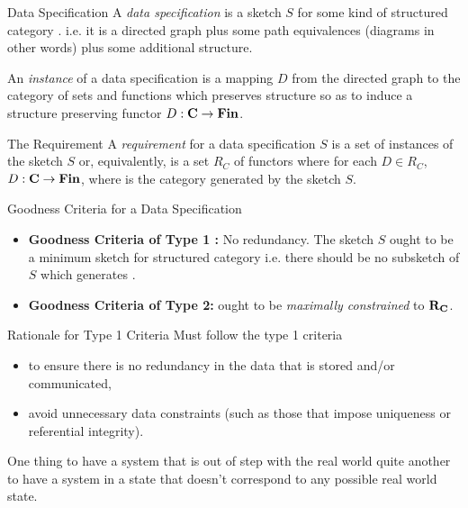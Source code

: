 
\begin{frame}{Data Specification}
A \textit{data specification} is a sketch $S$ for some kind of structured category \catc.
i.e. it is a directed graph plus some path equivalences (diagrams in other words) plus 
some additional structure.  

An \textit{instance} of a data specification is a mapping $D$ from the directed graph
to the category of sets and functions which preserves structure so as
to induce a structure preserving functor $D: \textbf{C} \rightarrow \textbf{Fin}$.
\end{frame}

\begin{frame}{The Requirement}
A \textit{requirement} for a data specification $S$ 
is a set of instances of the sketch $S$ or, equivalently, is a set $R_C$ of functors where for each
$D \in R_C$, $D: \textbf{C} \rightarrow \textbf{Fin}$, where \catcw is the category generated by the sketch $S$.
\end{frame}

\begin{frame}{Goodness Criteria for a Data Specification}
\IfSforCwithRCwordsvariant 
\begin{itemize}
\item 
\textbf {Goodness Criteria of Type 1 :} No redundancy. The sketch $S$ ought to be a minimum sketch for structured category \catcw i.e. there should be no subsketch of $S$ which generates  \catc.
\item
\textbf {Goodness Criteria of Type 2:} \catcw ought to be \textit{maximally constrained} to $\textbf{R}_{\textbf{C}}$.
\end{itemize}
\end{frame}

\begin{frame}{Rationale for Type 1 Criteria}
Must follow the type 1 criteria 
\begin{itemize}
\item to ensure there is no redundancy in the  data that is stored and/or communicated,
\item avoid unnecessary data constraints (such as those that impose uniqueness or referential integrity).
\end{itemize} 
\medskip
One thing to have a system that is out of step with the real world quite another to have a system 
in a state that doesn't correspond to any possible  real world state.
\end{frame}


